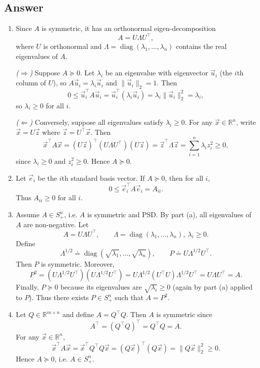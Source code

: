 \documentclass[
  12pt,
]{fphw}
\begin{document}
\subsection*{Answer}

\begin{enumerate}
\item[(a)] Since $A$ is symmetric, it has an orthonormal eigen-decomposition
\[
A = U\Lambda U^\top,
\]
where $U$ is orthonormal and $\Lambda=\operatorname{diag}(\lambda_1,\dots,\lambda_n)$ contains the real eigenvalues of $A$.

\emph{($\Rightarrow$)} Suppose $A\succeq 0$. Let $\lambda_i$ be an eigenvalue with eigenvector $\vec{u}_i$ (the $i$th column of $U$),
so $A\vec{u}_i=\lambda_i \vec{u}_i$ and $\|\vec{u}_i\|_2=1$. Then
\[
0 \le \vec{u}_i^\top A \vec{u}_i = \vec{u}_i^\top (\lambda_i \vec{u}_i)=\lambda_i \|\vec{u}_i\|_2^2=\lambda_i,
\]
so $\lambda_i\ge 0$ for all $i$.

\emph{($\Leftarrow$)} Conversely, suppose all eigenvalues satisfy $\lambda_i\ge 0$. For any $\vec{x}\in\mathbb{R}^n$, write $\vec{x}=U\vec{z}$ where
$\vec{z}=U^\top \vec{x}$. Then
\[
\vec{x}^\top A \vec{x}
=
(U\vec{z})^\top (U\Lambda U^\top)(U\vec{z})
=
\vec{z}^\top \Lambda \vec{z}
=
\sum_{i=1}^n \lambda_i z_i^2
\ge 0,
\]
since $\lambda_i\ge 0$ and $z_i^2\ge 0$. Hence $A\succeq 0$.

\item[(b)] Let $\vec{e}_i$ be the $i$th standard basis vector. If $A\succeq 0$, then for all $i$,
\[
0 \le \vec{e}_i^\top A \vec{e}_i = A_{ii}.
\]
Thus $A_{ii}\ge 0$ for all $i$.

\item[(c)] Assume $A\in S^n_+$, i.e. $A$ is symmetric and PSD. By part (a), all eigenvalues of $A$ are non-negative.
Let
\[
A = U\Lambda U^\top,
\qquad
\Lambda=\operatorname{diag}(\lambda_1,\dots,\lambda_n),\ \lambda_i\ge 0.
\]
Define
\[
\Lambda^{1/2} \doteq \operatorname{diag}(\sqrt{\lambda_1},\dots,\sqrt{\lambda_n}),
\qquad
P \doteq U\Lambda^{1/2}U^\top.
\]
Then $P$ is symmetric. Moreover,
\[
P^2
=
(U\Lambda^{1/2}U^\top)(U\Lambda^{1/2}U^\top)
=
U\Lambda^{1/2}(U^\top U)\Lambda^{1/2}U^\top
=
U\Lambda U^\top
=
A.
\]
Finally, $P\succeq 0$ because its eigenvalues are $\sqrt{\lambda_i}\ge 0$ (again by part (a) applied to $P$).
Thus there exists $P\in S^n_+$ such that $A=P^2$.

\item[(d)] Let $Q\in\mathbb{R}^{m\times n}$ and define $A=Q^\top Q$. Then $A$ is symmetric since
\[
A^\top = (Q^\top Q)^\top = Q^\top Q = A.
\]
For any $\vec{x}\in\mathbb{R}^n$,
\[
\vec{x}^\top A \vec{x}
=
\vec{x}^\top Q^\top Q \vec{x}
=
(Q\vec{x})^\top (Q\vec{x})
=
\|Q\vec{x}\|_2^2
\ge 0.
\]
Hence $A\succeq 0$, i.e. $A\in S^n_+$.


\end{enumerate}
\end{document}
